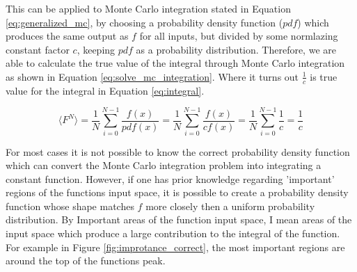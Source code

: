 \documentclass[../dissertation.tex]{subfiles}
\begin{document}
This can be applied to Monte Carlo integration stated in Equation \ref{eq:generalized_mc}, by choosing a probability density function ($pdf$) which produces the same output as $f$ for all inputs, but divided by some normlazing constant factor $c$, keeping $pdf$ as a probability distribution. Therefore, we are able to calculate the true value of the integral through Monte Carlo integration as shown in Equation \ref{eq:solve_mc_integration}. Where it turns out $\frac{1}{c}$ is true value for the integral in Equation \ref{eq:integral}.

\begin{equation}
\label{eq:solve_mc_integration}
\langle F^N \rangle = \frac{1}{N} \sum^{N-1}_{i=0} \frac{f(x)}{pdf(x)} = \frac{1}{N} \sum^{N-1}_{i=0} \frac{f(x)}{cf(x)} =  \frac{1}{N} \sum^{N-1}_{i=0} \frac{1}{c} = \frac{1}{c}
\end{equation}

For most cases it is not possible to know the correct probability density function which can convert the Monte Carlo integration problem into integrating a constant function. However, if one has prior knowledge regarding 'important' regions of the functions input space, it is possible to create a probability density function whose shape matches $f$ more closely then a uniform probability distribution. By Important areas of the function input space, I mean areas of the input space which produce a large contribution to the integral of the function. For example in Figure \ref{fig:improtance_correct}, the most important regions are around the top of the functions peak. 
\end{document}
